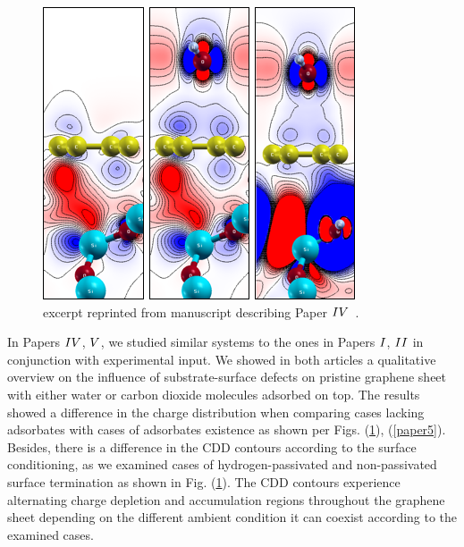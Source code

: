\begin{figure}
    \centering
    \includegraphics[width=\textwidth]{Figs/Paper4.png}
    \caption{excerpt reprinted from manuscript describing Paper \hyperref[P4]{$\Rmnum{4}$}~\cite{Smith2015}.}
    \label{paper4}
\end{figure}

In Papers \hyperref[P4]{$\Rmnum{4}$}, \hyperref[P5]{$\Rmnum{5}$}, we studied similar systems to the ones in Papers \hyperref[P1]{$\Rmnum{1}$}, \hyperref[P2]{$\Rmnum{2}$} in conjunction with experimental input. We showed in both articles a qualitative overview on the influence of substrate-surface defects on pristine graphene sheet with either water or carbon dioxide molecules adsorbed on top. The results showed a difference in the charge distribution when comparing cases lacking adsorbates with cases of adsorbates existence as shown per Figs. (\ref{paper4}), (\ref{paper5}). Besides, there is a difference in the CDD contours according to the surface conditioning, as we examined cases of hydrogen-passivated and non-passivated surface termination as shown in Fig. (\ref{paper4}). The CDD contours experience alternating charge depletion and accumulation regions throughout the graphene sheet depending on the different ambient condition it can coexist according to the examined cases.

